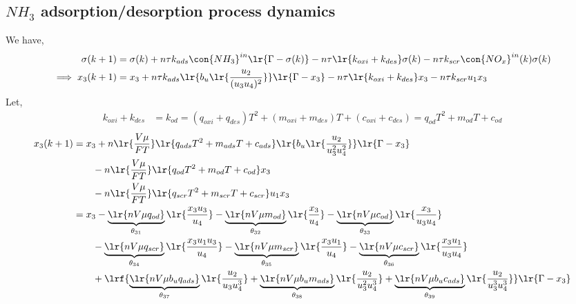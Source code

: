 \subsection{$NH_3$ adsorption/desorption process dynamics}
We have,
\begin{align*}
        \sigma(k + 1) &= \sigma(k)
        + n\tau k_{ads} \con{NH_3}^{in} \lr{\Gamma - \sigma(k)}
        - n \tau \lr{k_{oxi} + k_{des}} \sigma(k)
        - n \tau k_{scr} \con{NO_x}^{in}(k) \sigma(k) \\
        \implies x_3(k+1) &= x_3
                + n\tau k_{ads} \lr{b_u \lr{\frac{u_2}{(u_3 u_4)^2}}} \lr{\Gamma - x_3}
                - n \tau \lr{k_{oxi} + k_{des}} x_3
                - n \tau k_{scr} u_1 x_3
\end{align*}
Let,
\begin{align*}
        k_{oxi} + k_{des} &= k_{od} = (q_{oxi} + q_{des})T^2 + (m_{oxi} + m_{des}) T + (c_{oxi} + c_{des}) = q_{od} T^2 + m_{od} T + c_{od}
\end{align*}
\begin{align*}
        x_3(k+1) &= x_3
                + n \lr{\frac{V \mu}{FT}} \lr{q_{ads} T^2 + m_{ads} T + c_{ads}} \lr{b_u \lr{\frac{u_2}{u_3^2 u_4^2}}} \lr{\Gamma - x_3} \\
                & \qquad - n \lr{\frac{V \mu}{FT}} \lr{q_{od} T^2 + m_{od} T + c_{od}} x_3 \\
                & \qquad - n \lr{\frac{V \mu}{FT}} \lr{q_{scr} T^2 + m_{scr} T + c_{scr}} u_1 x_3\\
                &= x_3 - \underbrace{\lr{n V \mu q_{od}}}_{\theta_{31}} \lr{\frac{x_3 u_3}{u_4}}
                       - \underbrace{\lr{n V \mu m_{od}}}_{\theta_{32}} \lr{\frac{x_3}{u_4}}
                       - \underbrace{\lr{n V \mu c_{od}}}_{\theta_{33}} \lr{\frac{x_3}{u_3 u_4}} \\
                & \qquad - \underbrace{\lr{n V \mu q_{scr}}}_{\theta_{34}} \lr{\frac{x_3 u_1 u_3}{u_4}}
                         - \underbrace{\lr{n V \mu m_{scr}}}_{ \theta_{35}}\lr{\frac{x_3 u_1}{u_4}}
                         - \underbrace{\lr{n V \mu c_{scr}}}_{\theta_{36}} \lr{\frac{x_3 u_1}{u_3 u_4}} \\
                & \qquad +\lrf{ \underbrace{\lr{n V \mu b_u q_{ads}} }_{\theta_{37}}\lr{\frac{u_2}{u_3 u_4^3}}
                              + \underbrace{\lr{n V \mu b_u m_{ads}} }_{\theta_{38}}\lr{\frac{u_2}{u_3^2 u_4^3}}
                              + \underbrace{\lr{n V \mu b_u c_{ads}} }_{\theta_{39}}\lr{\frac{u_2}{u_3^3 u_4^3}} } \lr{\Gamma - x_3}
\end{align*}
